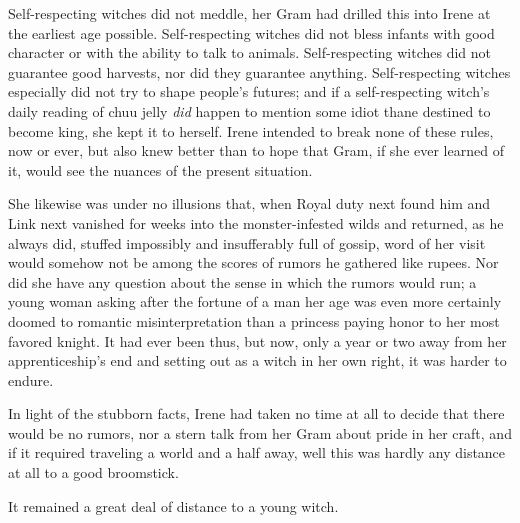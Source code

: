 \documentclass[../FGP.tex]{subfiles}
\begin{document}
Self-respecting witches did not meddle, her Gram had drilled this into Irene at the earliest age possible. Self-respect\-ing witches did not bless infants with good character or with the ability to talk to animals. Self-respecting witches did not guarantee good harvests, nor did they guarantee anything. Self-respecting witches especially did not try to shape people's futures; and if a self-respecting witch's daily reading of chuu jelly \emph{did} happen to mention some idiot thane destined to become king, she kept it to herself.%
Irene intended to break none of these rules, now or ever, but also knew better than to hope that Gram, if she ever learned of it, would see the nuances of the present situation.

She likewise was under no illusions that, when Royal duty next found him and Link next vanished for weeks into the monster-infested wilds and returned, as he always did, stuffed impossibly and insufferably full of gossip, word of her visit would somehow not be among the scores of rumors he gathered like rupees. Nor did she have any question about the sense in which the rumors would run; a young woman asking after the fortune of a man her age was even more certainly doomed to romantic misinterpretation than a princess paying honor to her most favored knight. It had ever been thus, but now, only a year or two away from her apprenticeship's end and setting out as a witch in her own right, it was harder to endure.

In light of the stubborn facts, Irene had taken no time at all to decide that there would be no rumors, nor a stern talk from her Gram about pride in her craft, and if it required traveling a world and a half away, well this was hardly any distance at all to a good broomstick.

It remained a great deal of distance to a young witch.  

\end{document}

